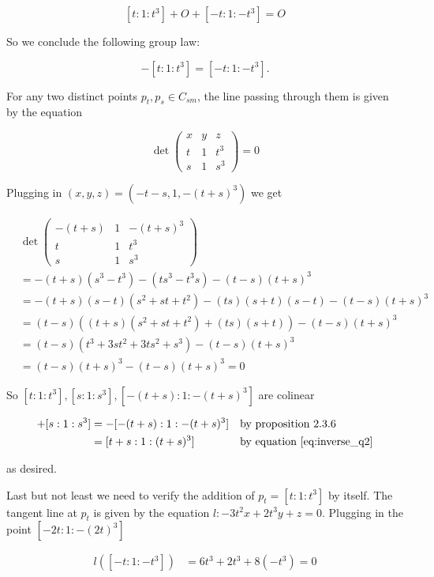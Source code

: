 \documentclass{article}
\theoremstyle{definition}
\theoremstyle{definition}
\theoremstyle{remark}
\begin{document}
$$
[t: 1: t^3] + O + [-t: 1: -t^3] = O
$$

So we conclude the following group law:

\begin{equation}\label{eq:inverse_q2}
	-[t: 1: t^3] = [-t: 1: -t^3].
\end{equation}

For any two distinct points $p_t, p_s \in C_{sm}$, the line passing through them is given by the equation

$$
\det \begin{pmatrix}
	x & y & z \\
	t & 1 & t^3 \\
	s & 1 & s^3
\end{pmatrix} = 0 
$$

Plugging in $(x, y, z) = (-t - s, 1, -(t+s)^3)$ we get 

\begin{align*}
	&\det \begin{pmatrix}
		-(t + s) & 1 & -(t + s)^3 \\
		t & 1 & t^3 \\
		s & 1 & s^3
	\end{pmatrix} \\
	&= -(t + s)(s^3 - t^3) - (ts^3 - t^3s) - (t - s)(t + s)^3 \\
	&= -(t + s)(s-t)(s^2 +st +t^2) - (ts)(s + t)(s-t) - (t - s)(t + s)^3 \\
	&= (t-s)((t + s)(s^2 +st +t^2) + (ts)(s + t)) - (t - s)(t + s)^3 \\
	&= (t - s)(t^3 + 3st^2 + 3ts^2 + s^3) - (t - s)(t + s)^3 \\ 
	&= (t-s)(t+s)^3 - (t-s)(t+s)^3 = 0
\end{align*}

So $[t: 1: t^3], [s: 1: s^3], [-(t+s): 1: -(t+s)^3]$ are colinear

\begin{align*}
	[t: 1: t^3] + [s: 1: s^3] 
	&= -  [-(t+s): 1: -(t+s)^3] &&\text{by proposition 2.3.6}\\
	&= [t + s: 1: (t+s)^3]	&&\text{by equation \ref{eq:inverse_q2}}
\end{align*}

as desired.

Last but not least we need to verify the addition of $p_t = [t: 1 : t^3] $ by itself.
The tangent line at $p_t$ is given by the equation $ l : -3t^2x + 2t^3 y + z = 0$.
Plugging in the point $[-2t: 1: -(2t)^3]$

\begin{align*}
	l([-t: 1: -t^3]) &= 6t^3 + 2 t^3 + 8 (-t^3) = 0 
\end{align*}
\end{document}
